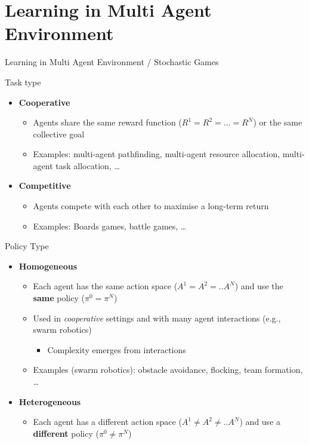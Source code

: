 \documentclass[presentation, 8pt]{beamer}\mode<presentation>{\usetheme{AMSBolognaFC}}
\begin{document}
\section{Learning in Multi Agent Environment}
\begin{frame}[allowframebreaks]{Learning in Multi Agent Environment / Stochastic Games}
\begin{exampleblock}{Task type}
	\begin{itemize}
		\item \textbf{Cooperative}
		\begin{itemize}
			\item Agents share the same reward function ($R^1 = R^2 = \dots = R^N$) or the same collective goal
			\item Examples: multi-agent pathfinding, multi-agent resource allocation, multi-agent task allocation, \dots
		\end{itemize}
		\item \textbf{Competitive}
		\begin{itemize}
			\item Agents compete with each other to maximise a long-term return
			\item Examples: Boards games, battle games, \dots
		\end{itemize}
	\end{itemize}
\end{exampleblock}
\begin{exampleblock}{Policy Type}
\begin{itemize}
	\item \textbf{Homogeneous}
	\begin{itemize}
		\item Each agent has the same action space ($ A^1 = A^2 = .. A ^N$) and use the \textbf{same} policy ($ \pi^0 = \pi^N$)
		\item Used in \emph{cooperative} settings and with many agent interactions (e.g., swarm robotics)
		\begin{itemize}
			\item Complexity emerges from interactions
		\end{itemize}
		\item Examples (swarm robotics): obstacle avoidance, flocking, team formation, \dots
	\end{itemize}
	\item \textbf{Heterogeneous}
	\begin{itemize}
		\item Each agent has a different action space ($ A^1 \neq A^2 \neq .. A ^N$) and use a \textbf{different} policy ($ \pi^0 \neq \pi^N$)

\end{itemize}
\end{itemize}
\end{exampleblock}
\end{frame}
\end{document}
